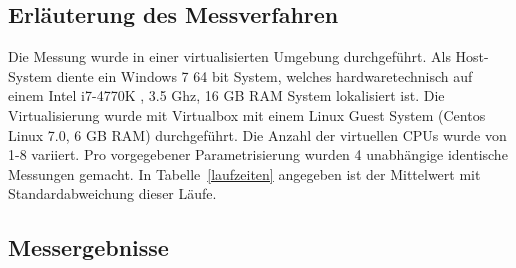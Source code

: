 \documentclass[10pt,a4paper]{report}
\begin{document}
\subsection{Erläuterung des Messverfahren}

Die Messung wurde in einer virtualisierten Umgebung durchgeführt. Als Host-System diente ein Windows 7 64 bit System, welches hardwaretechnisch auf einem Intel i7-4770K , 3.5 Ghz, 16 GB RAM System lokalisiert ist. Die Virtualisierung wurde mit Virtualbox mit einem Linux Guest System (Centos Linux 7.0, 6 GB RAM) durchgeführt. 
Die Anzahl der virtuellen CPUs wurde von 1-8 variiert.
Pro vorgegebener Parametrisierung wurden 4 unabhängige identische Messungen gemacht. In Tabelle~\ref{laufzeiten} angegeben ist der Mittelwert mit Standardabweichung dieser Läufe.
 

\subsection{Messergebnisse}
\end{document}

